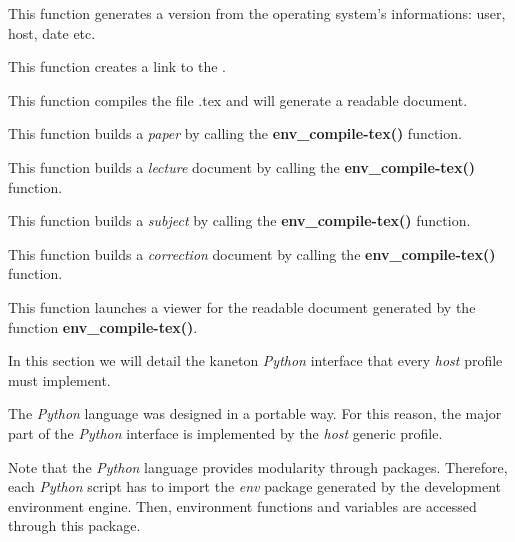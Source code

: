          {
	   This function generates a version  from the operating
	   system's informations: user, host, date etc.
	 }

         {
	   This function creates a link  to the .
	 }

         {
	   This function compiles the file .tex and
	   will generate a readable document.
	 }

         {
	   This function builds a \textit{paper} by calling the
	   \textbf{env\_compile-tex()} function.
	 }

         {
	   This function builds a \textit{lecture} document by calling the
	   \textbf{env\_compile-tex()} function.
	 }

         {
	   This function builds a \textit{subject} by calling the
	   \textbf{env\_compile-tex()} function.
	 }

         {
	   This function builds a \textit{correction} document by calling the
	   \textbf{env\_compile-tex()} function.
	 }

         {
	   This function launches a viewer for the readable document
	   generated by the function \textbf{env\_compile-tex()}.
	 }



In this section we will detail the kaneton \textit{Python} interface that
every \textit{host} profile must implement.

The \textit{Python} language was designed in a portable way. For this
reason, the major part of the \textit{Python} interface is implemented
by the \textit{host} generic profile.

Note that the \textit{Python} language provides modularity through packages.
Therefore, each \textit{Python} script has to import the \textit{env} package
generated by the development environment engine. Then, environment functions
and variables are accessed through this package.

